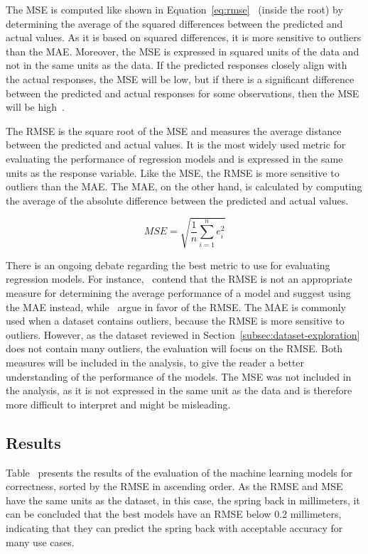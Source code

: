 The MSE is computed like shown in Equation~\ref{eq:rmse}~\cite[p. 1248]{chai2014root} (inside the root) by determining
the average of the squared differences between the predicted and actual values.
As it is based on squared differences, it is more sensitive to outliers than the MAE.
Moreover, the MSE is expressed in squared units of the data and not in the same units as the data.
If the predicted responses closely align with the actual responses, the MSE will be low, but if there is a significant
difference between the predicted and actual responses for some observations, then the MSE will be
high~\cite[p. 30]{hastie2009elements}.

The RMSE is the square root of the MSE and measures the average distance between the predicted and actual values.
It is the most widely used metric for evaluating the performance of regression models and is expressed in the same units
as the response variable.
Like the MSE, the RMSE is more sensitive to outliers than the MAE.
The MAE, on the other hand, is calculated by computing the average of the absolute difference between the predicted
and actual values.

\begin{tcolorbox}[arc=0pt,boxrule=0.5pt]
    \begin{equation}
        \label{eq:rmse}
        MSE = \sqrt{\frac{1}{n} \sum_{i=1}^{n} e_i^2}
    \end{equation}
\end{tcolorbox}

There is an ongoing debate regarding the best metric to use for evaluating regression models.
For instance,~\cite{willmott2005advantages} contend that the RMSE is not an appropriate measure for determining the
average performance of a model and suggest using the MAE instead, while~\cite{chai2014root} argue in favor of the
RMSE.
The MAE is commonly used when a dataset contains outliers, because the RMSE is more sensitive to outliers.
However, as the dataset reviewed in Section~\ref{subsec:dataset-exploration} does not contain many outliers, the
evaluation will focus on the RMSE.
Both measures will be included in the analysis, to give the reader a better understanding of the performance of
the models.
The MSE was not included in the analysis, as it is not expressed in the same unit as the data and is therefore
more difficult to interpret and might be misleading.

\subsection{Results}\label{subsec:results}
Table~ presents the results of the evaluation of the machine learning models for
correctness, sorted by the RMSE in ascending order.
As the RMSE and MSE have the same units as the dataset, in this case, the spring back in millimeters, it can be
concluded that the best models have an RMSE below 0.2 millimeters, indicating that they can predict the spring back
with acceptable accuracy for many use cases.

